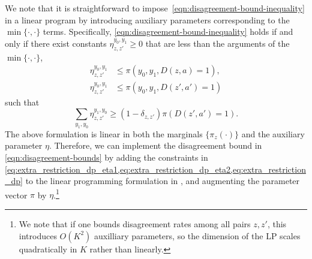 \documentclass[12pt]{article}%
\theoremstyle{definition}
\newcommand\1{\operatorname{I}\indicatorfence}
\begin{document}
We note that it is straightforward to
impose~\eqref{eqn:disagreement-bound-inequality} in a linear program by
introducing auxiliary parameters corresponding to the $\min\{\cdot, \cdot\}$
terms. Specifically, \cref{eqn:disagreement-bound-inequality} holds if and only
if there exist constants $\eta^{y_0,y_1}_{z, z'} \geq 0$ that are less
than the arguments of the $\min\{\cdot, \cdot\}$,
\begin{align}\label{eq:extra_restriction_dp_eta1}
  \eta^{y_0, y_1}_{z, z'} &\leq \pi(y_0,y_1, D(z, a) = 1), \\
  \eta^{y_0, y_1}_{z, z'} &\leq \pi(y_0,y_1, D(z', a') = 1)\label{eq:extra_restriction_dp_eta2}
\end{align}
such that
\begin{equation}\label{eq:extra_restriction_dp}
  \sum_{y_1, y_0} \eta^{y_1, y_0}_{z, z'} \geq (1-\delta_{z, z'}) \pi(D(z', a') =1).
\end{equation}
The above formulation is linear in both the marginals $\{\pi_{z}(\cdot)\}$ and
the auxiliary parameter $\eta$. Therefore, we can implement the disagreement
bound in \cref{eqn:disagreement-bounds} by adding the constraints in
\cref{eq:extra_restriction_dp_eta1,eq:extra_restriction_dp_eta2,eq:extra_restriction_dp}
to the linear programming formulation in , and
augmenting the parameter vector $\pi$ by $\eta$.\footnote{We note that if one bounds disagreement rates among all pairs $z,z'$, this introduces $O(K^2)$ auxilliary parameters, so the dimension of the LP scales quadratically in $K$ rather than linearly.}
\end{document}
